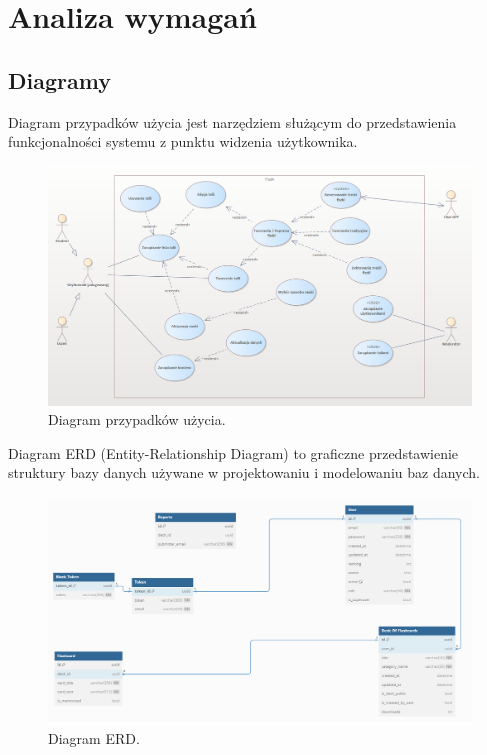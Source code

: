 \newapage
\chapter{Analiza wymagań}

\section{Diagramy}

\setlength{\parindent}{15pt}

\indent Diagram przypadków użycia jest narzędziem służącym do przedstawienia funkcjonalności systemu z punktu widzenia użytkownika.

\begin{figure}[H]
    \centering
    \includegraphics[width=1\textwidth]{chapters/chapter_6/diagram_przypadkow_uzycia}
    \caption{Diagram przypadków użycia.}
    \label{img:diagram_przypadkow_uzycia}
\end{figure}


\setlength{\parindent}{15pt}

\indent Diagram ERD (Entity-Relationship Diagram) to graficzne przedstawienie struktury bazy danych używane w projektowaniu i modelowaniu baz danych.



\begin{figure}[H]
    \centering
    \includegraphics[width=1\textwidth]{chapters/chapter_6/erd}
    \caption{Diagram ERD.}
    \label{img:erd}
\end{figure}



